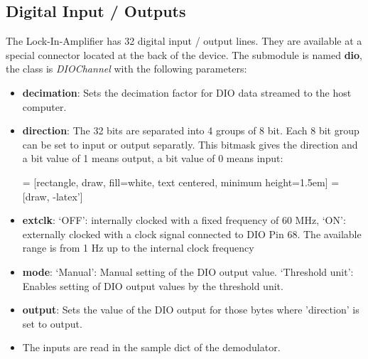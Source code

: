\documentclass[11pt]{article} %
\begin{document}
\subsection{Digital Input / Outputs}
The Lock-In-Amplifier has 32 digital input / output lines. They are available at a special connector located at the back of the device. The submodule is named {\bf dio}, the class is {\it DIOChannel} with the following parameters:
\begin{itemize}
\item {\bf decimation}: Sets the decimation factor for DIO data streamed to the host computer.
\item {\bf direction}: The 32 bits are separated into 4 groups of 8 bit. Each 8 bit group can be set to input or output separatly. This bitmask gives the direction and a bit value of 1 means output, a bit value of 0 means input:

 = [rectangle, draw, fill=white, text centered, minimum height=1.5em]
 = [draw, -latex']

\item {\bf extclk}: `OFF': internally clocked with a fixed frequency of 60 MHz, `ON':  externally clocked with a clock signal connected to DIO Pin 68. The available range is from 1 Hz up to the internal clock frequency
\item {\bf mode}: `Manual': Manual setting of the DIO output value. `Threshold unit': Enables setting of DIO output values by the threshold unit.
\item {\bf output}: Sets the value of the DIO output for those bytes where 'direction' is set to output.
\item The inputs are read in the sample dict of the demodulator.
\end{itemize}
\end{document}
